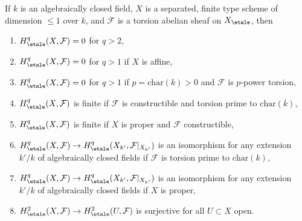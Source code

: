 \begin{theorem}
\label{theorem-vanishing-affine-curves}
If $k$ is an algebraically closed field, $X$ is a separated, finite type
scheme of dimension $\leq 1$ over $k$, and $\mathcal{F}$ is a torsion
abelian sheaf on $X_\etale$, then
\begin{enumerate}
\item
$H^q_\etale(X, \mathcal{F}) = 0$ for $q > 2$,
\item
$H^q_\etale(X, \mathcal{F}) = 0$ for $q > 1$ if $X$ is affine,
\item
$H^q_\etale(X, \mathcal{F}) = 0$ for $q > 1$ if $p = \text{char}(k) > 0$
and $\mathcal{F}$ is $p$-power torsion,
\item
$H^q_\etale(X, \mathcal{F})$ is finite if $\mathcal{F}$ is
constructible and torsion prime to $\text{char}(k)$,
\item
$H^q_\etale(X, \mathcal{F})$ is finite if $X$ is proper and
$\mathcal{F}$ constructible,
\item
$H^q_\etale(X, \mathcal{F}) \to
H^q_\etale(X_{k'}, \mathcal{F}|_{X_{k'}})$ is an isomorphism
for any extension $k'/k$ of algebraically closed fields
if $\mathcal{F}$ is torsion prime to $\text{char}(k)$,
\item
$H^q_\etale(X, \mathcal{F}) \to
H^q_\etale(X_{k'}, \mathcal{F}|_{X_{k'}})$ is an isomorphism
for any extension $k'/k$ of algebraically closed fields
if $X$ is proper,
\item
$H^2_\etale(X, \mathcal{F}) \to H^2_\etale(U, \mathcal{F})$
is surjective for all $U \subset X$ open.
\end{enumerate}
\end{theorem}

